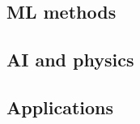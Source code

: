 \documentclass{beamer}
\begin{document}
\subsection{ML methods}


\subsection{AI and physics}

\subsection{Applications}



%
%
\end{document}
